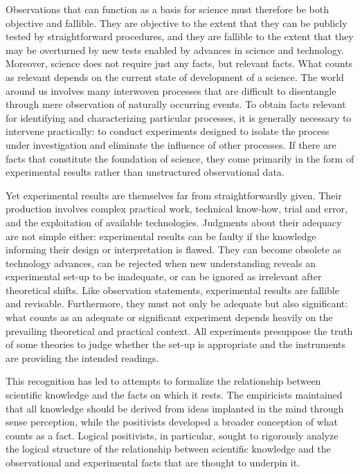 Observations that can function as a basis for science must therefore be both objective and fallible. They are objective to the extent that they can be publicly tested by straightforward procedures, and they are fallible to the extent that they may be overturned by new tests enabled by advances in science and technology. Moreover, science does not require just any facts, but relevant facts. What counts as relevant depends on the current state of development of a science. The world around us involves many interwoven processes that are difficult to disentangle through mere observation of naturally occurring events. To obtain facts relevant for identifying and characterizing particular processes, it is generally necessary to intervene practically: to conduct experiments designed to isolate the process under investigation and eliminate the influence of other processes. If there are facts that constitute the foundation of science, they come primarily in the form of experimental results rather than unstructured observational data.

Yet experimental results are themselves far from straightforwardly given. Their production involves complex practical work, technical know-how, trial and error, and the exploitation of available technologies. Judgments about their adequacy are not simple either: experimental results can be faulty if the knowledge informing their design or interpretation is flawed. They can become obsolete as technology advances, can be rejected when new understanding reveals an experimental set-up to be inadequate, or can be ignored as irrelevant after theoretical shifts. Like observation statements, experimental results are fallible and revisable. Furthermore, they must not only be adequate but also significant: what counts as an adequate or significant experiment depends heavily on the prevailing theoretical and practical context. All experiments presuppose the truth of some theories to judge whether the set-up is appropriate and the instruments are providing the intended readings.

This recognition has led to attempts to formalize the relationship between scientific knowledge and the facts on which it rests. The empiricists maintained that all knowledge should be derived from ideas implanted in the mind through sense perception, while the positivists developed a broader conception of what counts as a fact. Logical positivists, in particular, sought to rigorously analyze the logical structure of the relationship between scientific knowledge and the observational and experimental facts that are thought to underpin it.

